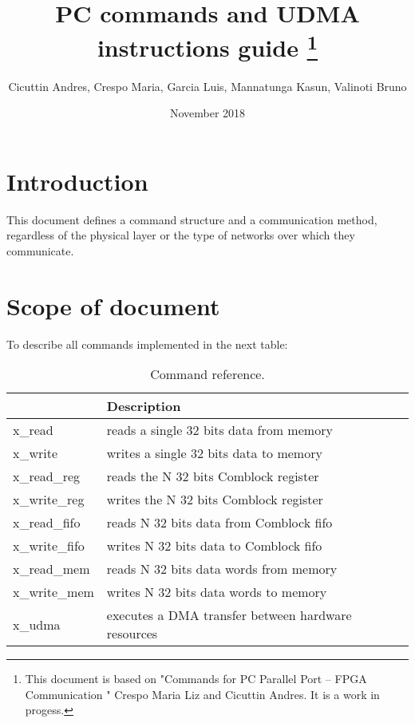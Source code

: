 \documentclass{article}
\title{PC commands and UDMA instructions guide \footnote{This document is based on "Commands for PC Parallel Port – FPGA Communication " Crespo Maria Liz and Cicuttin Andres. It is a work in progess.} }
\author{Cicuttin Andres, Crespo Maria, Garcia Luis, Mannatunga Kasun, Valinoti Bruno}
\date{November 2018}
\begin{document}
\maketitle
\newpage

\section{Introduction}

This document defines a command structure and a communication method, regardless of the physical layer or the type of networks over 
which they communicate.


\section{Scope of document}
To describe all commands implemented in the next table:

\begin{table}[h!]
\begin{tabular}{|l|l|}
\hline
\rowcolor[HTML]{C0C0C0} 
\multicolumn{1}{|c|}{\cellcolor[HTML]{C0C0C0}\textbf{Command}} & \textbf{Description}                               \\ \hline
x\_read                                                        & reads a single 32 bits data from memory             \\ \hline
x\_write                                                       & writes a single 32 bits data to memory              \\ \hline
x\_read\_reg                                                   & reads the N 32 bits Comblock register               \\ \hline
x\_write\_reg                                                  & writes the N 32 bits Comblock register              \\ \hline
x\_read\_fifo                                                  & reads N 32 bits data from Comblock fifo             \\ \hline
x\_write\_fifo                                                 & writes N 32 bits data to Comblock fifo              \\ \hline
x\_read\_mem                                                   & reads N 32 bits data words from memory              \\ \hline
x\_write\_mem                                                  & writes N 32 bits data words to memory               \\ \hline
x\_udma                                                        & executes a DMA transfer between hardware resources \\ \hline
\end{tabular}
\caption{Command reference.}
\label{table:cmdRef}
\end{table}
\end{document}
